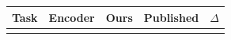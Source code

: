 \begin{tabular}{llrrr}
\toprule
Task & Encoder & Ours & Published & $\Delta$ \\
\midrule
\multicolumn{5}{c}{\pending{}} \\
\bottomrule
\end{tabular}
